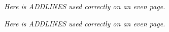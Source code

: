 \documentclass[twoside,twocolumn]{article}
\begin{document}
\lipsum[1-9]

\emph{Here is ADDLINES used correctly on an even page.}
\addline

\lipsum[1]
\squeezepage

\lipsum[2]

\lipsum[1-9]

\emph{Here is ADDLINES used correctly on an even page.}
\addline

\lipsum[1]
\squeezepage[-3]

\lipsum[2]

\lipsum[1-9]
\end{document}
